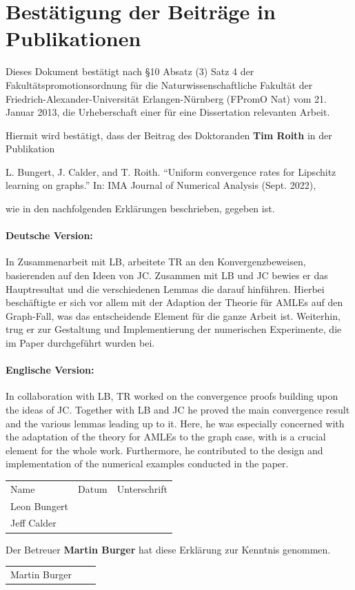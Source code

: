 \documentclass[12pt]{article}
\begin{document}
\section*{Bestätigung der Beiträge in Publikationen}

Dieses Dokument bestätigt nach \S10 Absatz (3) Satz 4 der Fakultätspromotionsordnung für die Naturwissenschaftliche Fakultät der
Friedrich-Alexander-Universität Erlangen-Nürnberg (FPromO Nat) vom 21. Januar 2013, die Urheberschaft einer für eine Dissertation relevanten Arbeit.\par

\vspace{15pt}
\noindent
Hiermit wird bestätigt, dass der Beitrag des Doktoranden \textbf{Tim Roith} in der Publikation
%
\begin{center}
L. Bungert, J. Calder, and T. Roith. “Uniform convergence rates for Lipschitz
learning on graphs.” In: IMA Journal of Numerical Analysis (Sept.
2022),
\end{center}
%
wie in den nachfolgenden Erklärungen beschrieben, gegeben ist.

\paragraph{Deutsche Version:} In Zusammenarbeit mit LB, arbeitete TR an den Konvergenzbeweisen, basierenden auf den Ideen von JC. Zusammen mit LB und JC bewies er das Hauptresultat und die verschiedenen Lemmas die darauf hinführen. Hierbei beschäftigte er sich vor allem mit der Adaption der Theorie für AMLEs auf den Graph-Fall, was das entscheidende Element für die ganze Arbeit ist. Weiterhin, trug er zur Gestaltung und Implementierung der numerischen Experimente, die im Paper durchgeführt wurden bei. 

\paragraph{Englische Version:} In collaboration with LB, TR worked on the convergence proofs building upon the ideas of JC. Together with LB and JC he proved the main convergence result and the various lemmas leading up to it. Here, he was especially concerned with the adaptation of the theory for AMLEs to the graph case, with is a crucial element for the whole work. Furthermore, he contributed to the design and implementation of the numerical examples conducted in the paper.
\vspace{50pt}

\renewcommand{\arraystretch}{4}
\begin{tabular}{l l l}
Name & Datum & Unterschrift\\
Leon Bungert & \raisebox{-3pt}{\makebox[5cm]{.\dotfill}} & \raisebox{-3pt}{\makebox[5cm]{.\dotfill}}\\
%
Jeff Calder & \raisebox{-3pt}{\makebox[5cm]{.\dotfill}} & \raisebox{-3pt}{\makebox[5cm]{.\dotfill}}\\
\end{tabular}%
%
\vspace{50pt}

\noindent
Der Betreuer \textbf{Martin Burger} hat diese Erklärung zur Kenntnis genommen.

\begin{tabular}{l l l}
	Martin Burger & \raisebox{-3pt}{\makebox[5cm]{.\dotfill}} & \raisebox{-3pt}{\makebox[5cm]{.\dotfill}}
\end{tabular}%

 
\end{document}
